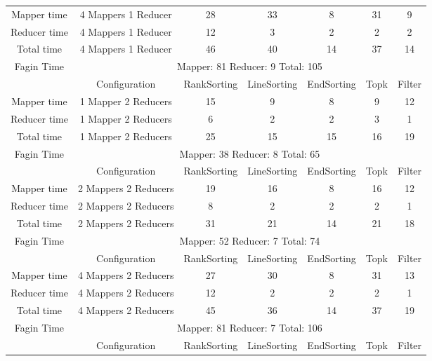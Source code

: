 \documentclass[a4paper]{article}
\begin{document}
\begin{table}[htbp]
\begin{center}
\begin{tabular}{|c|c|c|c|c|c|c|}
            Mapper time & 4 Mappers 1 Reducer & 28 & 33 & 8 & 31 & 9  \\
            Reducer time & 4 Mappers 1 Reducer & 12 & 3 & 2 & 2 & 2   \\
            Total time & 4 Mappers 1 Reducer & 46 & 40 & 14 & 37 & 14 \\
            \hline
            Fagin Time & \multicolumn{6}{|c|}{Mapper: 81 Reducer: 9 Total: 105}  \\
            \hline
            \hline
             & Configuration & RankSorting & LineSorting & EndSorting & Topk & Filter  \\
            \hline
            Mapper time & 1 Mapper 2 Reducers & 15 & 9 & 8 & 9 & 12  \\
            Reducer time & 1 Mapper 2 Reducers & 6 & 2 & 2 & 3 & 1   \\
            Total time & 1 Mapper 2 Reducers & 25 & 15 & 15 & 16 & 19 \\
            \hline
            Fagin Time & \multicolumn{6}{|c|}{Mapper: 38 Reducer: 8 Total: 65}  \\
            \hline
            \hline
             & Configuration & RankSorting & LineSorting & EndSorting & Topk & Filter  \\
            \hline
            Mapper time & 2 Mappers 2 Reducers & 19 & 16 & 8 & 16 & 12  \\
            Reducer time & 2 Mappers 2 Reducers & 8 & 2 & 2 & 2 & 1   \\
            Total time & 2 Mappers 2 Reducers & 31 & 21 & 14 & 21 & 18 \\
            \hline
            Fagin Time & \multicolumn{6}{|c|}{Mapper: 52 Reducer: 7 Total: 74}  \\
            \hline
            \hline
             & Configuration & RankSorting & LineSorting & EndSorting & Topk & Filter  \\
            \hline
            Mapper time & 4 Mappers 2 Reducers & 27 & 30 & 8 & 31 & 13  \\
            Reducer time & 4 Mappers 2 Reducers & 12 & 2 & 2 & 2 & 1   \\
            Total time & 4 Mappers 2 Reducers & 45 & 36 & 14 & 37 & 19 \\
            \hline
            Fagin Time & \multicolumn{6}{|c|}{Mapper: 81    Reducer: 7  Total: 106}  \\
            \hline
            \hline
             & Configuration & RankSorting & LineSorting & EndSorting & Topk & Filter  \\

\end{tabular}
\end{center}
\end{table}
\end{document}
